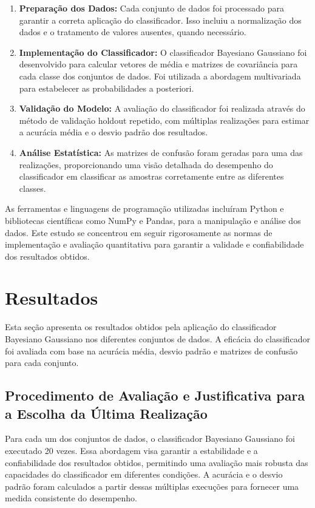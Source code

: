 \documentclass[12pt, a4paper]{report}
\begin{document}
\begin{enumerate}
    \item \textbf{Preparação dos Dados:} Cada conjunto de dados foi processado para garantir a correta aplicação do classificador. Isso incluiu a normalização dos dados e o tratamento de valores ausentes, quando necessário.
    \item \textbf{Implementação do Classificador:} O classificador Bayesiano Gaussiano foi desenvolvido para calcular vetores de média e matrizes de covariância para cada classe dos conjuntos de dados. Foi utilizada a abordagem multivariada para estabelecer as probabilidades a posteriori.
    \item \textbf{Validação do Modelo:} A avaliação do classificador foi realizada através do método de validação holdout repetido, com múltiplas realizações para estimar a acurácia média e o desvio padrão dos resultados.
    \item \textbf{Análise Estatística:} As matrizes de confusão foram geradas para uma das realizações, proporcionando uma visão detalhada do desempenho do classificador em classificar as amostras corretamente entre as diferentes classes.
\end{enumerate}

As ferramentas e linguagens de programação utilizadas incluíram Python e bibliotecas científicas como NumPy e Pandas, para a manipulação e análise dos dados. Este estudo se concentrou em seguir rigorosamente as normas de implementação e avaliação quantitativa para garantir a validade e confiabilidade dos resultados obtidos.

\chapter{Resultados}

Esta seção apresenta os resultados obtidos pela aplicação do classificador Bayesiano Gaussiano nos diferentes conjuntos de dados. A eficácia do classificador foi avaliada com base na acurácia média, desvio padrão e matrizes de confusão para cada conjunto.

\section{Procedimento de Avaliação e Justificativa para a Escolha da Última Realização}

Para cada um dos conjuntos de dados, o classificador Bayesiano Gaussiano foi executado 20 vezes. Essa abordagem visa garantir a estabilidade e a confiabilidade dos resultados obtidos, permitindo uma avaliação mais robusta das capacidades do classificador em diferentes condições. A acurácia e o desvio padrão foram calculados a partir dessas múltiplas execuções para fornecer uma medida consistente do desempenho.
\end{document}
